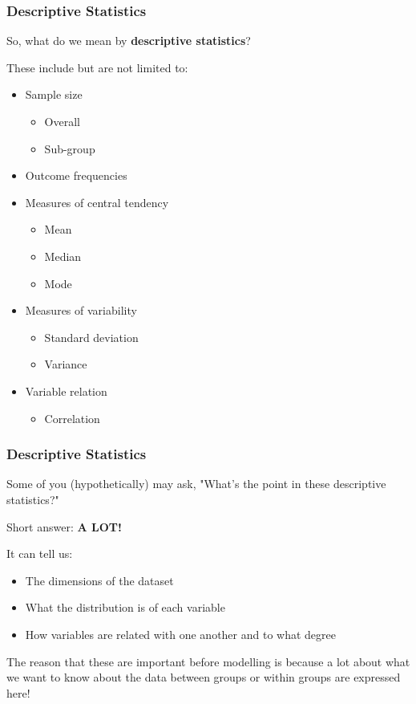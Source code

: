 \documentclass[10pt, compress]{beamer}
\begin{document}
\begin{frame}[fragile]
\frametitle{Descriptive Statistics}
So, what do we mean by \textbf{descriptive statistics}? 

These include but \alert{are not limited to}:

\begin{itemize}
\item Sample size
	\begin{itemize}
		\item Overall
		\item Sub-group
	\end{itemize}
\item Outcome frequencies
\item Measures of central tendency
	 \begin{itemize}
		\item Mean
		\item Median
		\item Mode
	\end{itemize}
\item Measures of variability
	 \begin{itemize}
		\item Standard deviation
		\item Variance
	\end{itemize}
\item Variable relation
	 \begin{itemize}
		\item Correlation
	\end{itemize}
\end{itemize}

\end{frame}

\begin{frame}[fragile]
\frametitle{Descriptive Statistics}
Some of you (hypothetically) may ask, \alert{"What's the point in these descriptive statistics?"}

Short answer: \textbf{A LOT!}

It can tell us:

\begin{itemize}
\item The dimensions of the dataset
\item What the distribution is of each variable
\item How variables are related with one another and to what degree
\end{itemize}

The reason that these are important before modelling is because a lot about what we want to know about the data between groups or within groups are expressed here!

\end{frame}
\end{document}
